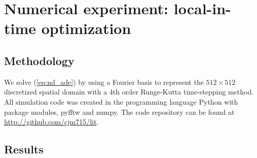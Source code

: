 \documentclass[12pt]{iopart}
\begin{document}
%
\section{Numerical experiment: local-in-time optimization}
\label{sec:numerical_experiment}
\subsection{Methodology}

We solve (\ref{eq:nd_ade}) by using a Fourier basis to represent the $512 \times 512$ discretized spatial domain with a 4th order Runge-Kutta time-stepping method. All simulation code was created in the programming language Python with package modules, pyfftw and numpy. The code repository can be found at \href{http://github.com/cjm715/lit}{ http://github.com/cjm715/lit}.

\subsection{Results}
\end{document}
